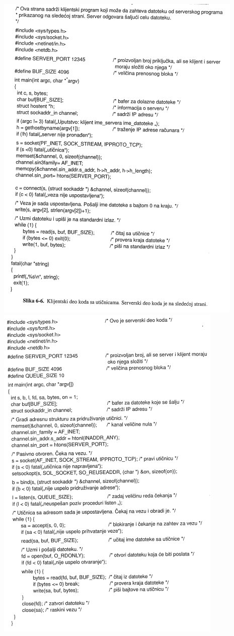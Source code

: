 \documentclass{article} %
\begin{document}
\begin{center}
	\includegraphics[scale=0.5]{program}
	\includegraphics[scale=0.5]{program2}
\end{center}
\end{document}
